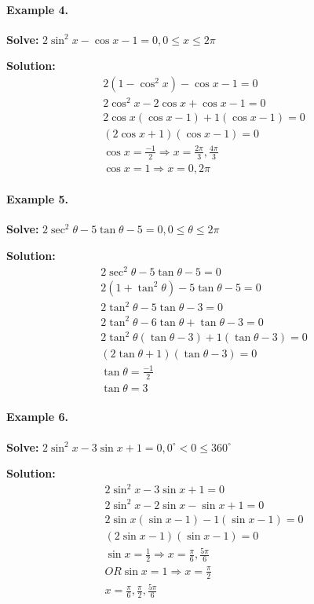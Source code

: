 \documentclass{article}
\begin{document}
\paragraph{Example 4.}
\textbf{Solve:} $2\sin^{2}x - \cos x - 1=0, 0 \leq x \leq 2\pi$

{\scriptsize \textbf{Solution:}}
\[
  \begin{aligned}
    2(1 - \cos^{2}x) - \cos x - 1 = 0 \\
    2\cos^{2}x - 2 \cos x + \cos x - 1 = 0 \\
    2\cos x(\cos x - 1) + 1 (\cos x - 1) = 0 \\
    (2\cos x + 1) (\cos x - 1) = 0 \\
    \cos x = \frac{-1}{2} \Rightarrow x = \frac{2\pi}{3}, \frac{4\pi}{3} \\
    \cos x = 1 \Rightarrow x = 0, 2\pi
  \end{aligned}
\]

\paragraph{Example 5.}
\textbf{Solve:} $2\sec^{2}\theta - 5\tan\theta - 5=0, 0 \leq \theta \leq 2\pi$

{\scriptsize \textbf{Solution:}}
\[
  \begin{aligned}
    2\sec^{2}\theta - 5\tan\theta - 5=0 \\
    2(1+\tan^{2}\theta) - 5\tan\theta - 5 = 0 \\
    2\tan^{2}\theta - 5\tan\theta - 3 = 0 \\
    2\tan^{2}\theta - 6\tan\theta + \tan\theta - 3 = 0 \\
    2\tan^{2}\theta(\tan\theta - 3) + 1(\tan\theta-3) = 0 \\
    (2\tan\theta+1)(\tan\theta-3)=0 \\
    \tan\theta = \frac{-1}{2} \\
    \tan\theta = 3
  \end{aligned}
\]

\paragraph{Example 6.}
\textbf{Solve:} $2\sin^{2}x - 3\sin x + 1=0, 0^{\circ} < 0 \leq 360^{\circ}$

{\scriptsize \textbf{Solution:}}
\[
  \begin{aligned}
    2\sin^{2}x - 3\sin x + 1=0 \\
    2\sin^{2}x - 2\sin x - \sin x + 1 = 0 \\
    2\sin x(\sin x - 1) - 1(\sin x - 1) = 0 \\
    (2\sin x - 1)(\sin x - 1) = 0 \\
    \sin x = \frac{1}{2} \Rightarrow x = \frac{\pi}{6}, \frac{5\pi}{6} \\
    OR \sin x = 1 \Rightarrow x = \frac{\pi}{2} \\
    x = \frac{\pi}{6}, \frac{\pi}{2}, \frac{5\pi}{6}
  \end{aligned}
\]
\end{document}
